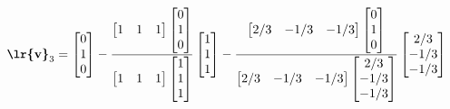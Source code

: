 \documentclass[a4paper,12pt]{report}
\begin{document}
         $$
         \textbf{\lr{v}}_3=
         \begin{bmatrix}
         	0 \\ 1 \\ 0
         \end{bmatrix}
         -
         \frac
         {
         	\begin{bmatrix}
         		1 & 1 & 1
         	\end{bmatrix}
         	\begin{bmatrix}
         		0 \\ 1 \\ 0
         	\end{bmatrix}
         }
         {
         	\begin{bmatrix}
         		1 & 1 & 1
         	\end{bmatrix}
         	\begin{bmatrix}
         		1 \\ 1 \\ 1
         	\end{bmatrix}
         }
         \begin{bmatrix}
         	1 \\ 1 \\ 1
         \end{bmatrix}
     	 -
     	 \frac
     	 {
     	 	\begin{bmatrix}
     	 		2/3 & -1/3 & -1/3
     	 	\end{bmatrix}
     	 	\begin{bmatrix}
     	 		0 \\ 1 \\ 0
     	 	\end{bmatrix}
     	 }
     	 {
     	 	\begin{bmatrix}
     	 		2/3 & -1/3 & -1/3
     	 	\end{bmatrix}
     	 	\begin{bmatrix}
     	 		2/3 \\ -1/3 \\ -1/3
     	 	\end{bmatrix}
     	 }
     	 \begin{bmatrix}
     	 	2/3 \\ -1/3 \\ -1/3
     	 \end{bmatrix}
      	 $$
\end{document}
